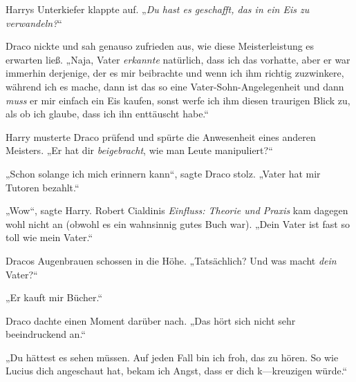 Harrys Unterkiefer klappte auf. „\emph{Du hast es geschafft, \emph{das} in ein Eis zu verwandeln?}“

Draco nickte und sah genauso zufrieden aus, wie diese Meisterleistung es erwarten ließ. „Naja, Vater \emph{erkannte} natürlich, dass ich das vorhatte, aber er war immerhin derjenige, der es mir beibrachte und wenn ich ihm richtig zuzwinkere, während ich es mache, dann ist das so eine Vater-Sohn-Angelegenheit und dann \emph{muss} er mir einfach ein Eis kaufen, sonst werfe ich ihm diesen traurigen Blick zu, als ob ich glaube, dass ich ihn enttäuscht habe.“

Harry musterte Draco prüfend und spürte die Anwesenheit eines anderen Meisters. „Er hat dir \emph{beigebracht}, wie man Leute manipuliert?“

„Schon solange ich mich erinnern kann“, sagte Draco stolz. „Vater hat mir Tutoren bezahlt.“

„Wow“, sagte Harry. Robert Cialdinis \emph{Einfluss: Theorie und Praxis} kam dagegen wohl nicht an (obwohl es ein wahnsinnig gutes Buch war). „Dein Vater ist fast so toll wie mein Vater.“

Dracos Augenbrauen schossen in die Höhe. „Tatsächlich? Und was macht \emph{dein} Vater?“

„Er kauft mir Bücher.“

Draco dachte einen Moment darüber nach. „Das hört sich nicht sehr beeindruckend an.“

„Du hättest es sehen müssen. Auf jeden Fall bin ich froh, das zu hören. So wie Lucius dich angeschaut hat, bekam ich Angst, dass er dich k—kreuzigen würde.“

